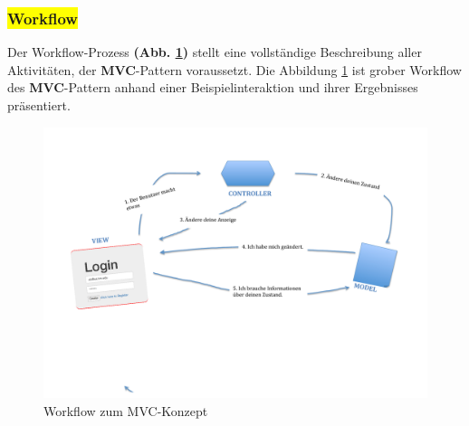 \subsubsection{\colorbox{yellow}{Workflow}}

Der Workflow-Prozess \textbf{(Abb. \ref{img:mvc})} stellt eine vollständige Beschreibung aller Aktivitäten, der \textbf{MVC}-Pattern voraussetzt. Die Abbildung \ref{img:mvc} ist grober Workflow des \textbf{MVC}-Pattern anhand einer Beispielinteraktion und ihrer Ergebnisses präsentiert.
\begin{figure}[H]
\centering
\includegraphics[trim = 0mm 60mm 0mm 20mm, clip, width=1.0\textwidth]{resources/mvc}
\caption[Workflow zum MVC-Konzept]{Workflow zum MVC-Konzept}
\label{img:mvc}
\end{figure}

